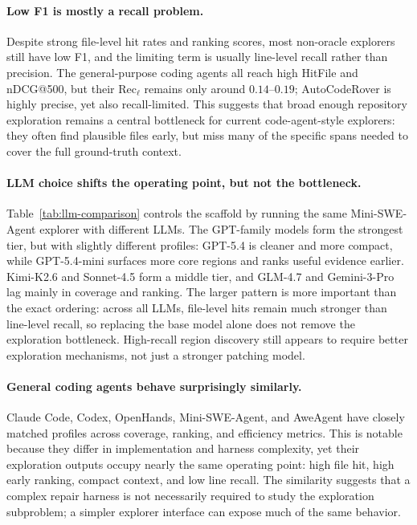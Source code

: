 \paragraph{Low F1 is mostly a recall problem.}
Despite strong file-level hit rates and ranking scores, most non-oracle explorers still have low F1, and the limiting term is usually line-level recall rather than precision. The general-purpose coding agents all reach high HitFile and nDCG@500, but their Rec$_\ell$ remains only around $0.14$--$0.19$; AutoCodeRover is highly precise, yet also recall-limited. This suggests that broad enough repository exploration remains a central bottleneck for current code-agent-style explorers: they often find plausible files early, but miss many of the specific spans needed to cover the full ground-truth context.

 
\paragraph{LLM choice shifts the operating point, but not the bottleneck.}
Table~\ref{tab:llm-comparison} controls the scaffold by running the same Mini-SWE-Agent explorer with different LLMs. The GPT-family models form the strongest tier, but with slightly different profiles: GPT-5.4 is cleaner and more compact, while GPT-5.4-mini surfaces more core regions and ranks useful evidence earlier. Kimi-K2.6 and Sonnet-4.5 form a middle tier, and GLM-4.7 and Gemini-3-Pro lag mainly in coverage and ranking. The larger pattern is more important than the exact ordering: across all LLMs, file-level hits remain much stronger than line-level recall, so replacing the base model alone does not remove the exploration bottleneck. High-recall region discovery still appears to require better exploration mechanisms, not just a stronger patching model.

 
\paragraph{General coding agents behave surprisingly similarly.}
Claude Code, Codex, OpenHands, Mini-SWE-Agent, and AweAgent have closely matched profiles across coverage, ranking, and efficiency metrics. This is notable because they differ in implementation and harness complexity, yet their exploration outputs occupy nearly the same operating point: high file hit, high early ranking, compact context, and low line recall. The similarity suggests that a complex repair harness is not necessarily required to study the exploration subproblem; a simpler explorer interface can expose much of the same behavior.

